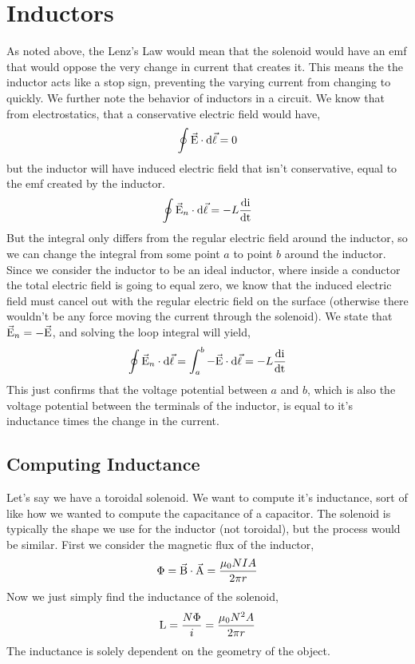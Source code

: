\section{Inductors}
As noted above, the Lenz's Law would mean that the solenoid would have an emf that would oppose the very change in current that creates it. This means the the inductor acts like a stop sign, preventing the varying current from changing to quickly. We further note the behavior of inductors in a circuit. We know that from electrostatics, that a conservative electric field would have, 
\begin{equation*}
	\oint \vec{\mathrm{E}} \cdot \mathrm{d}\vec{\mathrm{\ell}} = 0
\end{equation*}
but the inductor will have induced electric field that isn't conservative, equal to the emf created by the inductor. 
\begin{equation*}
	\oint \vec{\mathrm{E}}_n \cdot \mathrm{d}\vec{\mathrm{\ell}} = -L\frac{\mathrm{d i}}{\mathrm{d t}}
\end{equation*}
But the integral only differs from the regular electric field around the inductor, so we can change the integral from some point $a$ to point $b$ around the inductor. Since we consider the inductor to be an ideal inductor, where inside a conductor the total electric field is going to equal zero, we know that the induced electric field must cancel out with the regular electric field on the surface (otherwise there wouldn't be any force moving the current through the solenoid). We state that $\vec{\mathrm{E}}_n = -\vec{\mathrm{E}}$, and solving the loop integral will yield, 
\begin{equation*}
	\oint \vec{\mathrm{E}}_n \cdot \mathrm{d}\vec{\mathrm{\ell}} = \int_a^b -\vec{\mathrm{E}} \cdot \mathrm{d}\vec{\mathrm{\ell}} = 
	-L\frac{\mathrm{d i}}{\mathrm{d t}}
\end{equation*}
This just confirms that the voltage potential between $a$ and $b$, which is also the voltage potential between the terminals of the inductor, is equal to it's inductance times the change in the current. 

\subsection{Computing Inductance}
Let's say we have a toroidal solenoid. We want to compute it's inductance, sort of like how we wanted to compute the capacitance of a capacitor. The solenoid is typically the shape we use for the inductor (not toroidal), but the process would be similar. First we consider the magnetic flux of the inductor, 
\begin{equation*}
	\Phi = \vec{\mathrm{B}} \cdot \vec{\mathrm{A}} = \frac{\mu_0NIA}{2\pi r} 
\end{equation*}
Now we just simply find the inductance of the solenoid, 
\begin{equation*}
	\mathrm{L} = \frac{N\Phi}{i}=\frac{\mu_0N^2A}{2\pi r}
\end{equation*}
The inductance is solely dependent on the geometry of the object. 

